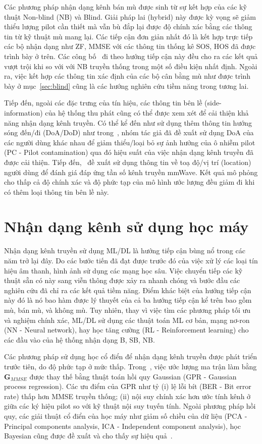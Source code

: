 Các phương pháp nhận dạng kênh bán mù được sinh từ sự kết hợp của các kỹ thuật Non-blind (NB) và Blind. Giải pháp lai (hybrid) này được kỳ vọng sẽ giảm thiểu lượng pilot cần thiết mà vẫn bù đắp lại được độ chính xác bằng các thông tin từ kỹ thuật mù mang lại. Các tiếp cận đơn giản nhất đó là kết hợp trực tiếp các bộ nhận dạng như ZF, MMSE với các thông tin thống kê SOS, HOS đã được trình bày ở trên. Các công bố~\cite{Wan2008, Ladaycia2019, Rekik2021} đi theo hướng tiếp cận này đều cho ra các kết quả vượt trội khi so với với NB truyền thống trong một số điều kiện nhất định. Ngoài ra, việc kết hợp các thông tin xác định của các bộ cân bằng mù như được trình bày ở mục~\ref{sec:blind} cũng là các hướng nghiên cứu tiềm năng trong tương lai.

Tiếp đến, ngoài các đặc trưng của tín hiệu, các thông tin bên lề (side-information) của hệ thống thu phát cũng có thể được xem xét để cải thiện khả năng nhận dạng kênh truyền. Có thể kể đến như sử dụng thêm thông tin hướng sóng đến/đi (DoA/DoD) như trong~\cite{Wang2016}, nhóm tác giả đã đề xuất sử dụng DoA của các người dùng khác nhau để giảm thiểu/loại bỏ sự ảnh hưởng của ô nhiễm pilot (PC - Pilot contamination) qua đó hiệu suất của việc nhận dạng kênh truyền đã được cải thiện. Tiếp đến,~\cite{Lin2020} đề xuất sử dụng thông tin về toạ độ/vị trí (location) người dùng để đánh giá đáp ứng tần số kênh truyền mmWave. Kết quả mô phỏng cho thấp cả độ chính xác và độ phức tạp của mô hình ước lượng đều giảm đi khi có thêm loại thông tin bên lề này.

\section{Nhận dạng kênh sử dụng học máy}

Nhận dạng kênh truyền sử dụng ML/DL là hướng tiếp cận bùng nổ trong các năm trở lại đây. Do các bước tiến đã đạt được trước đó của việc xử lý các loại tín hiệu âm thanh, hình ảnh sử dụng các mạng học sâu. Việc chuyển tiếp các kỹ thuật sẵn có này sang viễn thông được xảy ra nhanh chóng và bước đầu các nghiên cứu đã chỉ ra các kết quả tiềm năng. Điểm khác biệt của hướng tiếp cận này đó là nó bao hàm được lý thuyết của cả ba hướng tiếp cận kể trên bao gồm mù, bán mù, và không mù. Tuy nhiên, thay vì việc tìm các phương pháp tối ưu và nghiệm chính xác, ML/DL sử dụng các thuật toán ML cơ bản, mạng nơ-ron (NN - Neural network), hay học tăng cường (RL - Reinforcement learning) cho các đầu vào của hệ thống nhận dạng B, SB, NB.

Các phương pháp sử dụng học cổ điển để nhận dạng kênh truyền được phát triển trước tiên, do độ phức tạp ở mức thấp. Trong~\cite{Simeon2022}, việc ước lượng ma trận làm bằng $\mathbf{G}_{MMSE}$ được thay thế bằng thuật toán hồi quy Gaussian (GPR - Gaussian process regression). Các ưu điểm của GPR như tỷ (i) lệ lỗi bít (BER - Bit error rate) thấp hơn MMSE truyền thống; (ii) nội suy chính xác hơn ước tính kênh ở giữa các ký hiệu pilot so với kỹ thuật nội suy tuyến tính. Ngoài phương pháp hồi quy, các giải thuật cổ điển của học máy như giảm số chiều của dữ liệu (PCA - Principal components analysis, ICA - Independent component analysis), học Bayesian cũng được đề xuất và cho thấy sự hiệu quả~\cite{vilas2022}.

